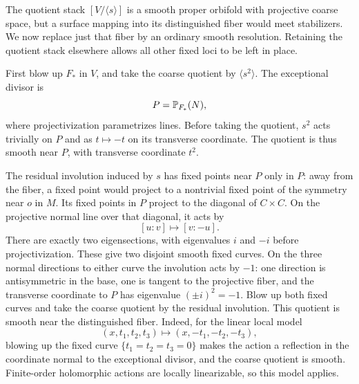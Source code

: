 The quotient stack $[V/\langle s\rangle]$ is a smooth proper orbifold
with projective coarse space, but a surface mapping into its distinguished
fiber would
meet stabilizers.  We now replace just that fiber by an ordinary
smooth resolution.  Retaining the quotient stack elsewhere allows
all other fixed loci to be left in place.

First blow up $F_*$ in $V$, and take the coarse quotient by
$\langle s^2\rangle$.  The exceptional divisor is
\begin{equation}\label{geo:P}
                          P=\mathbb P_{F_*}(N),
\end{equation}
where projectivization parametrizes lines.  Before taking the quotient,
$s^2$ acts trivially on $P$ and as $t\mapsto-t$ on its transverse
coordinate.  The quotient is thus smooth near $P$, with transverse
coordinate $t^2$.

The residual involution induced by $s$ has fixed points near $P$ only
in $P$: away from the fiber, a fixed point would project to a
nontrivial fixed point of the symmetry near $o$ in $M$.  Its fixed
points in $P$ project to the diagonal of $C\times C$.  On the
projective normal line over that diagonal, it acts by
\[
                       [u:v]\longmapsto[v:-u].
\]
There are exactly two eigensections, with eigenvalues $i$ and $-i$
before projectivization.  These give two disjoint smooth fixed curves.
On the three normal directions to either curve the involution acts
by $-1$: one direction is antisymmetric in the base, one is tangent
to the projective fiber, and the transverse coordinate to $P$ has
eigenvalue $(\pm i)^2=-1$.  Blow up both fixed curves and take the
coarse quotient by the residual involution.  This quotient is smooth
near the distinguished fiber.  Indeed, for the linear local model
\[
              (x,t_1,t_2,t_3)\longmapsto(x,-t_1,-t_2,-t_3),
\]
blowing up the fixed curve $\{t_1=t_2=t_3=0\}$ makes the action a
reflection in the coordinate normal to the exceptional divisor, and
the coarse quotient is smooth.  Finite-order holomorphic actions are
locally linearizable, so this model applies.


